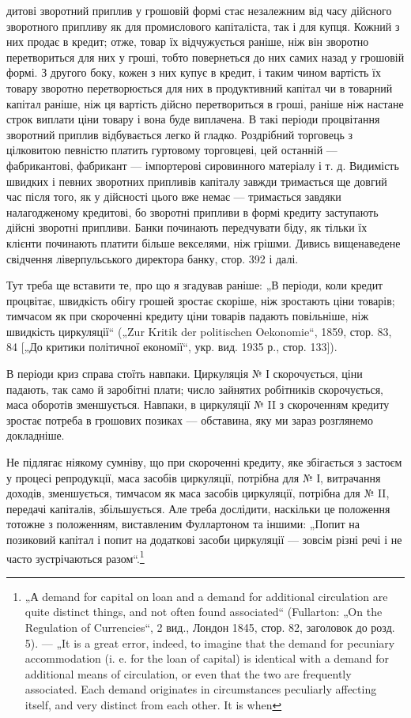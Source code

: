 дитові зворотний приплив у грошовій формі стає незалежним
від часу дійсного зворотного припливу як для промислового капіталіста, так і для купця. Кожний з них
продає в кредит; отже,
товар їх відчужується раніше, ніж він зворотно перетвориться
для них у гроші, тобто повернеться до них самих назад у грошовій формі. З другого боку, кожен з них
купує в кредит, і таким
чином вартість їх товару зворотно перетворюється для них
в продуктивний капітал чи в товарний капітал раніше, ніж ця вартість дійсно перетвориться в гроші,
раніше ніж настане строк виплати ціни товару і вона буде виплачена. В такі періоди процвітання
зворотний приплив відбувається легко й гладко. Роздрібний
торговець з цілковитою певністю платить гуртовому торговцеві,
цей останній — фабрикантові, фабрикант — імпортерові сировинного матеріалу і т. д. Видимість швидких
і певних зворотних припливів капіталу завжди тримається ще довгий час після того, як у
дійсності цього вже немає — тримається завдяки налагодженому
кредитові, бо зворотні припливи в формі кредиту заступають
дійсні зворотні припливи. Банки починають передчувати біду,
як тільки їх клієнти починають платити більше векселями, ніж
грішми. Дивись вищенаведене свідчення ліверпульського директора банку, стор. 392 і далі.

Тут треба ще вставити те, про що я згадував раніше: „В періоди,
коли кредит процвітає, швидкість обігу грошей зростає скоріше,
ніж зростають ціни товарів; тимчасом як при скороченні кредиту ціни товарів падають повільніше, ніж
швидкість циркуляції“
(„Zur Kritik der politischen Oekonomie“, 1859, стор. 83, 84 [„До
критики політичної економії“, укр. вид. 1935 р., стор. 133]).

В періоди криз справа стоїть навпаки. Циркуляція № І скорочується, ціни падають, так само й
заробітні плати; число зайнятих робітників скорочується, маса оборотів зменшується. Навпаки, в
циркуляції № II з скороченням кредиту зростає потреба
в грошових позиках — обставина, яку ми зараз розглянемо докладніше.

Не підлягає ніякому сумніву, що при скороченні кредиту,
яке збігається з застоєм у процесі репродукції, маса засобів
циркуляції, потрібна для № І, витрачання доходів, зменшується,
тимчасом як маса засобів циркуляції, потрібна для № II, передачі капіталів, збільшується. Але треба
дослідити, наскільки
це положення тотожне з положенням, виставленим Фуллартоном
та іншими: „Попит на позиковий капітал і попит на додаткові
засоби циркуляції — зовсім різні речі і не часто зустрічаються
разом“.\footnote{
„А demand for capital on loan and a demand for additional circulation are
quite distinct things, and not often found associated“ (Fullarton: „On the Regulation of
Currencies“, 2 вид., Лондон 1845, стор. 82, заголовок до розд. 5). — „It is
a great error, indeed, to imagine that the demand for pecuniary accommodation (i. e.
for the loan of capital) is identical with a demand for additional means of circulation,
or even that the two are frequently associated. Each demand originates in circumstances peculiarly
affecting itself, and very distinct from each other. It is when
}